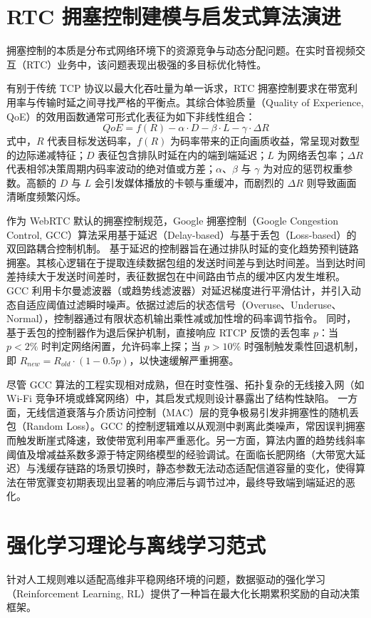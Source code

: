 \section{RTC 拥塞控制建模与启发式算法演进}
拥塞控制的本质是分布式网络环境下的资源竞争与动态分配问题。在实时音视频交互（RTC）业务中，该问题表现出极强的多目标优化特性。
\par 有别于传统 TCP 协议以最大化吞吐量为单一诉求\cite{Jacobson1988Congestion,Ha2008CUBIC,Cardwell2017BBR}，RTC 拥塞控制要求在带宽利用率与传输时延之间寻找严格的平衡点。其综合体验质量（Quality of Experience, QoE）的效用函数通常可形式化表征为如下非线性组合：
$$QoE = f(R) - \alpha \cdot D - \beta \cdot L - \gamma \cdot \Delta R$$
式中，$R$ 代表目标发送码率，$f(R)$ 为码率带来的正向画质收益，常呈现对数型的边际递减特征；$D$ 表征包含排队时延在内的端到端延迟；$L$ 为网络丢包率；$\Delta R$ 代表相邻决策周期内码率波动的绝对值或方差；$\alpha$、$\beta$ 与 $\gamma$ 为对应的惩罚权重参数。高额的 $D$ 与 $L$ 会引发媒体播放的卡顿与重缓冲，而剧烈的 $\Delta R$ 则导致画面清晰度频繁闪烁。
\par 作为 WebRTC 默认的拥塞控制规范，Google 拥塞控制（Google Congestion Control, GCC）算法\cite{Carlucci2016GCC}采用基于延迟（Delay-based）与基于丢包（Loss-based）的双回路耦合控制机制。
基于延迟的控制器旨在通过排队时延的变化趋势预判链路拥塞。其核心逻辑在于提取连续数据包组的发送时间差与到达时间差。当到达时间差持续大于发送时间差时，表征数据包在中间路由节点的缓冲区内发生堆积。GCC 利用卡尔曼滤波器（或趋势线滤波器）对延迟梯度进行平滑估计，并引入动态自适应阈值过滤瞬时噪声。依据过滤后的状态信号（Overuse、Underuse、Normal），控制器通过有限状态机输出乘性减或加性增的码率调节指令。
同时，基于丢包的控制器作为退后保护机制，直接响应 RTCP 反馈的丢包率 $p$：当 $p < 2\%$ 时判定网络闲置，允许码率上探；当 $p > 10\%$ 时强制触发乘性回退机制，即 $R_{new} = R_{old} \cdot (1 - 0.5p)$，以快速缓解严重拥塞。
\par 尽管 GCC 算法的工程实现相对成熟，但在时变性强、拓扑复杂的无线接入网（如 Wi-Fi 竞争环境或蜂窝网络）中，其启发式规则设计暴露出了结构性缺陷。
一方面，无线信道衰落与介质访问控制（MAC）层的竞争极易引发非拥塞性的随机丢包（Random Loss）。GCC 的控制逻辑难以从观测中剥离此类噪声，常因误判拥塞而触发断崖式降速，致使带宽利用率严重恶化。另一方面，算法内置的趋势线斜率阈值及增减益系数多源于特定网络模型的经验调试。在面临长肥网络（大带宽大延迟）与浅缓存链路的场景切换时，静态参数无法动态适配信道容量的变化，使得算法在带宽骤变初期表现出显著的响应滞后与调节过冲，最终导致端到端延迟的恶化。

\section{强化学习理论与离线学习范式}
针对人工规则难以适配高维非平稳网络环境的问题，数据驱动的强化学习（Reinforcement Learning, RL）\cite{Sutton2018RL}提供了一种旨在最大化长期累积奖励的自动决策框架。
